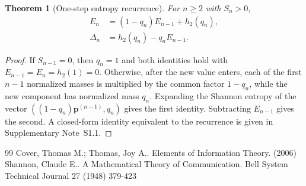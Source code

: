 \documentclass[10pt,a4paper]{amsart}
\newtheorem{theorem}{Theorem}
\begin{document}
\begin{theorem}[One-step entropy recurrence]
\label{thm:recurrence}
For \(n\ge2\) with \(S_n>0\),
\begin{equation}
\begin{aligned}
E_n
&=(1-q_n)E_{n-1}+h_2(q_n),\\
\Delta_n
&=h_2(q_n)-q_nE_{n-1}.
\end{aligned}
\label{eq:recurrence}
\end{equation}
\end{theorem}

\begin{proof}
If \(S_{n-1}=0\), then \(q_n=1\) and both identities hold with \(E_{n-1}=E_n=h_2(1)=0\). Otherwise, after the new value enters, each of the first \(n-1\) normalized masses is multiplied by the common factor \(1-q_n\), while the new component has normalized mass \(q_n\). Expanding the Shannon entropy of the vector \(((1-q_n)\bm p^{(n-1)},q_n)\) gives the first identity. Subtracting \(E_{n-1}\) gives the second. A closed-form identity equivalent to the recurrence is given in Supplementary Note~S1.1.
\end{proof}


\begin{thebibliography}{99}
 Cover, Thomas M.; Thomas, Joy A.. Elements of Information Theory. (2006)
 Shannon, Claude E.. A Mathematical Theory of Communication. Bell System Technical Journal 27 (1948) 379-423
\end{thebibliography}
\end{document}
